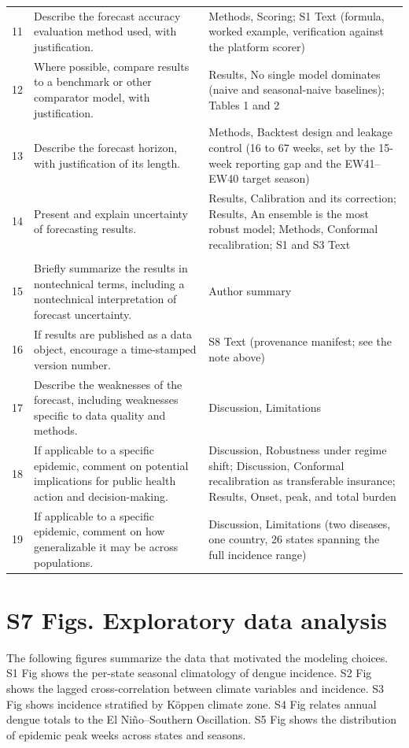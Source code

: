 \documentclass[11pt]{article}
\begin{document}
\begin{table}[p]
\begin{tabular}{@{}p{}p{}p{}@{}}
11 & Describe the forecast accuracy evaluation method used, with justification. &
Methods, Scoring; S1 Text (formula, worked example, verification against the platform scorer) \\
12 & Where possible, compare results to a benchmark or other comparator model, with justification. &
Results, No single model dominates (naive and seasonal-naive baselines); Tables 1 and 2 \\
13 & Describe the forecast horizon, with justification of its length. &
Methods, Backtest design and leakage control (16 to 67 weeks, set by the 15-week reporting gap and
the EW41--EW40 target season) \\
14 & Present and explain uncertainty of forecasting results. &
Results, Calibration and its correction; Results, An ensemble is the most robust model; Methods,
Conformal recalibration; S1 and S3 Text \\
\addlinespace
\multicolumn{3}{@{}l}{\emph{Translation, interpretability, and generalizability}} \\
15 & Briefly summarize the results in nontechnical terms, including a nontechnical interpretation
of forecast uncertainty. &
Author summary \\
16 & If results are published as a data object, encourage a time-stamped version number. &
S8 Text (provenance manifest; see the note above) \\
17 & Describe the weaknesses of the forecast, including weaknesses specific to data quality and
methods. &
Discussion, Limitations \\
18 & If applicable to a specific epidemic, comment on potential implications for public health
action and decision-making. &
Discussion, Robustness under regime shift; Discussion, Conformal recalibration as transferable
insurance; Results, Onset, peak, and total burden \\
19 & If applicable to a specific epidemic, comment on how generalizable it may be across
populations. &
Discussion, Limitations (two diseases, one country, 26 states spanning the full incidence range) \\
\bottomrule
\end{tabular}
\end{table}

\section*{S7 Figs. Exploratory data analysis}
The following figures summarize the data that motivated the modeling choices. S1 Fig shows the
per-state seasonal climatology of dengue incidence. S2 Fig shows the lagged cross-correlation between
climate variables and incidence. S3 Fig shows incidence stratified by K\"oppen climate zone. S4 Fig
relates annual dengue totals to the El Ni\~no--Southern Oscillation. S5 Fig shows the distribution of
epidemic peak weeks across states and seasons.
\end{document}

